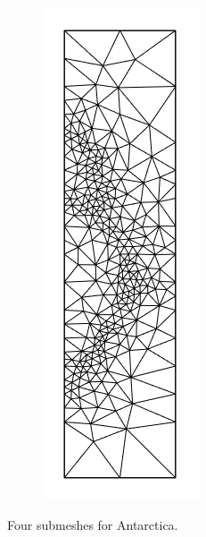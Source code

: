 \documentclass{article}
\begin{document}
\begin{figure}[H]
\begin{subfigure}[b]{0.1\linewidth}
    \caption{}
  \end{subfigure}
  \begin{subfigure}[b]{0.1\linewidth}
    \includegraphics[width=\linewidth]{Fig_submesh4.png}
    \caption{}
  \end{subfigure}
  \caption{Four submeshes for Antarctica.}
\end{figure}
\end{document}
